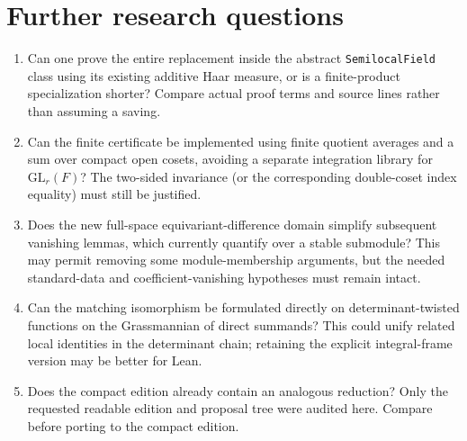 \documentclass[11pt]{article}
\theoremstyle{remark}\newtheorem{remark}[theorem]{Remark}
\newcommand{\GL}{\mathrm{GL}}
\begin{document}
\section{Further research questions}
\begin{enumerate}
\item Can one prove the entire replacement inside the abstract \texttt{SemilocalField} class using its existing additive Haar measure, or is a finite-product specialization shorter? Compare actual proof terms and source lines rather than assuming a saving.
\item Can the finite certificate be implemented using finite quotient averages and a sum over compact open cosets, avoiding a separate integration library for $\GL_r(F)$? The two-sided invariance (or the corresponding double-coset index equality) must still be justified.
\item Does the new full-space equivariant-difference domain simplify subsequent vanishing lemmas, which currently quantify over a stable submodule? This may permit removing some module-membership arguments, but the needed standard-data and coefficient-vanishing hypotheses must remain intact.
\item Can the matching isomorphism be formulated directly on determinant-twisted functions on the Grassmannian of direct summands? This could unify related local identities in the determinant chain; retaining the explicit integral-frame version may be better for Lean.
\item Does the compact edition already contain an analogous reduction? Only the requested readable edition and proposal tree were audited here. Compare before porting to the compact edition.
\end{enumerate}
\end{document}
